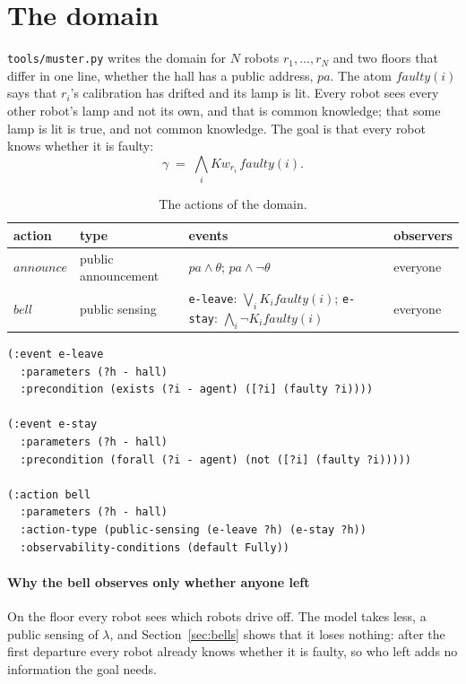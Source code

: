 \documentclass[11pt,a4paper]{article}
\theoremstyle{definition}
\newcommand{\Kop}[1]{K_{#1}}
\newcommand{\Kw}[1]{\mathit{Kw}_{#1}}
\newcommand{\code}[1]{\texttt{\small #1}}
\newcommand{\faulty}{\mathit{faulty}}
\newcommand{\some}{\theta}
\begin{document}
\section{The domain}
\label{sec:domain}

\code{tools/muster.py} writes the domain for $N$ robots $r_1, \dots, r_N$ and
two floors that differ in one line, whether the hall has a public address,
$\mathit{pa}$. The atom $\faulty(i)$ says that $r_i$'s calibration has drifted
and its lamp is lit. Every robot sees every other robot's lamp and not its own,
and that is common knowledge; that some lamp is lit is true, and not common
knowledge. The goal is that every robot knows whether it is faulty:
\[
  \gamma \;=\; \bigwedge_{i} \Kw{r_i}\,\faulty(i).
\]

\begin{table}[H]
\centering\small
\caption{The actions of the domain.}
\label{tab:actions}
\begin{tabularx}{\textwidth}{@{}>{\raggedright\arraybackslash}p{2.6cm} >{\raggedright\arraybackslash}p{3.4cm} >{\raggedright\arraybackslash}X >{\raggedright\arraybackslash}p{2.2cm}@{}}
\toprule
action & type & events & observers \\
\midrule
$\mathit{announce}$ & public announcement & $\mathit{pa} \wedge \some$; $\mathit{pa} \wedge \neg\some$ & everyone \\
$\mathit{bell}$ & public sensing & \code{e-leave}: $\bigvee_i \Kop{i}\faulty(i)$; \code{e-stay}: $\bigwedge_i \neg\Kop{i}\faulty(i)$ & everyone \\
\bottomrule
\end{tabularx}
\end{table}

\begin{lstlisting}[caption={The bell, in the domain \code{tools/muster.py} writes.}, label={lst:bell}]
(:event e-leave
  :parameters (?h - hall)
  :precondition (exists (?i - agent) ([?i] (faulty ?i))))

(:event e-stay
  :parameters (?h - hall)
  :precondition (forall (?i - agent) (not ([?i] (faulty ?i)))))

(:action bell
  :parameters (?h - hall)
  :action-type (public-sensing (e-leave ?h) (e-stay ?h))
  :observability-conditions (default Fully))
\end{lstlisting}

\paragraph{Why the bell observes only whether anyone left} On the floor every
robot sees which robots drive off. The model takes less, a public sensing of
$\lambda$, and Section~\ref{sec:bells} shows that it loses nothing: after the
first departure every robot already knows whether it is faulty, so who left
adds no information the goal needs.
\end{document}
